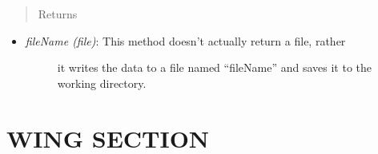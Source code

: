 \documentclass[letterpaper,10pt,english]{sphinxmanual}
\begin{document}
\begin{fulllineitems}
\begin{fulllineitems}
\begin{itemize}
\end{itemize}
\begin{quote}\begin{description}
\item[{Returns}] \leavevmode
\end{description}\end{quote}
\begin{itemize}
\item {} \begin{description}
\item[{\emph{fileName (file)}: This method doesn't actually return a file, rather}] \leavevmode
it writes the data to a file named ``fileName'' and saves it to the
working directory.

\end{description}

\end{itemize}

\end{fulllineitems}


\end{fulllineitems}



\section{WING SECTION}
\label{structures:wing-section}
\end{document}
